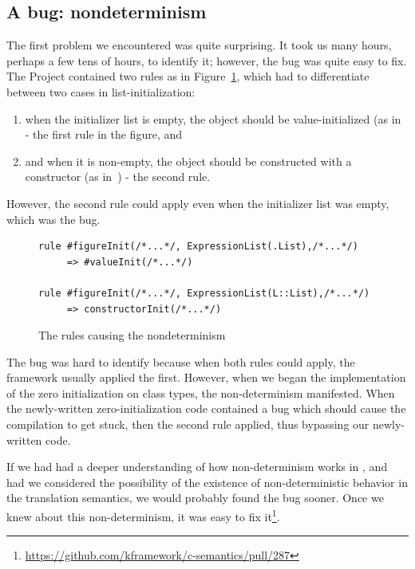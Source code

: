 \documentclass[nolot,nolof,nocover,printed]{fithesis3}
\newcommand{\Project}{Project\xspace}
\newcommand{\stdN}[2]{\cite[#2]{#1}\xspace}
\begin{document}
\subsection{A bug: nondeterminism}

The first problem we encountered was quite surprising. It took us many hours, perhaps a few tens of hours, to identify it; however, the bug was quite easy to fix. The \Project contained two rules as in Figure~\ref{fig:nondetRules}, which had to differentiate between two cases in list-initialization:
\begin{enumerate}
\item when the initializer list is empty, the object should be value-initialized (as in~\stdN{n4296}{\S 8.5.4/3.4} - the first rule in the figure, and
\item and when it is non-empty, the object should be constructed with a constructor (as in~\stdN{n4296}{\S 8.5.4/3.6}) - the second rule.
\end{enumerate}
However, the second rule could apply even when the initializer list was empty, which was the bug.

\begin{figure}[ht]
\begin{lstlisting}
rule #figureInit(/*...*/, ExpressionList(.List),/*...*/)
     => #valueInit(/*...*/)
     
rule #figureInit(/*...*/, ExpressionList(L::List),/*...*/)
     => constructorInit(/*...*/)
\end{lstlisting}
\caption{The rules causing the nondeterminism}
\label{fig:nondetRules}
\end{figure}

The bug was hard to identify because when both rules could apply, the \K framework usually applied the first. However, when we began the implementation of the zero initialization on class types, the non-determinism manifested. When the newly-written zero-initialization code contained a bug which should cause the compilation to get stuck, then the second rule applied, thus bypassing our newly-written code.

If we had had a deeper understanding of how non-determinism works in \K, and had we considered the possibility of the existence of non-deterministic behavior in the translation semantics, we would probably found the bug sooner. Once we knew about this non-deter\-minism, it was easy to fix it\footnote{\url{https://github.com/kframework/c-semantics/pull/287}}.

\end{document}
